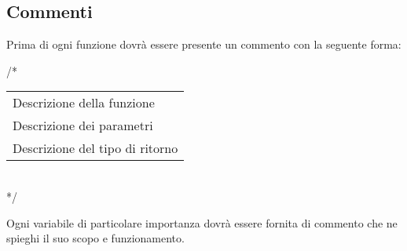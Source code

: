 \subsection{Commenti}

Prima di ogni funzione dovrà essere presente un commento con la seguente forma:

\begin{flushleft}
/*\\
\vspace{3mm}
\begin{tabular}{l}
	Descrizione della funzione\\
	Descrizione dei parametri\\		
	Descrizione del tipo di ritorno\\
\end{tabular}\\
\vspace{3mm}
*/

\end{flushleft}

Ogni variabile di particolare importanza dovrà essere fornita di commento che ne spieghi il suo scopo e funzionamento.